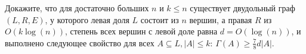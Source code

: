 Докажите, что для достаточно больших $n$ и $k \le n$ существует двудольный граф $(L, R, E)$, у которого левая доля $L$
состоит из $n$ вершин, а правая $R$ из $O(k\log(n))$, степень всех вершин с левой доле равна $d = O(\log(n))$, и выполнено
следующее свойство для всех $A \subseteq L, |A| \le k$: $\Gamma(A) \ge \frac{7}{8}d|A|$.